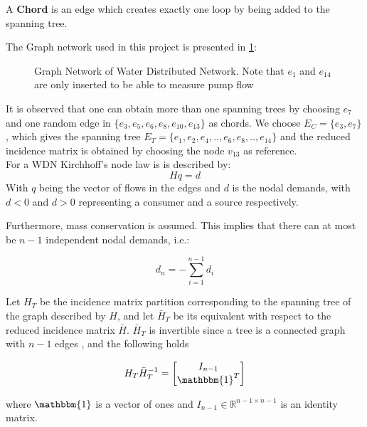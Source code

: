 A \textbf{Chord} is an edge which creates exactly one loop by being added to the spanning tree. 


The Graph network used in this project is presented in \cref{fig:tikzWDNGraph}:

\begin{figure}[h!]
	\centering
		\resizebox{\columnwidth}{!}{
	}
	\caption{Graph Network of Water Distributed Network. Note that $ e_1$ and $e_{14} $ are only inserted to be able to measure pump flow}
	\label{fig:tikzWDNGraph}
\end{figure}
It is observed that one can obtain more than one spanning trees by choosing $ e_7 $ and one random edge in $ \{e_3,e_5,e_6,e_8,e_{10},e_{13}\} $ as chords. We choose 
$ E_C = \{e_3,e_7\} $, which gives the spanning tree 
$ E_T = \{e_1,e_2,e_4,..,e_6,e_8,..,e_{14}\} $ and the reduced incidence matrix is obtained by choosing the node $ v_{13} $ as reference.\\

For a WDN Kirchhoff's node law is \cite{Jensen} is described by:
\begin{equation}\label{eq:KirchNodeLaw}
	Hq = d
\end{equation} 
With $ q $ being the vector of flows in the edges and $ d $ is the nodal demands, with $ d<0 $ and $ d>0 $ representing a consumer and a source respectively.   

Furthermore, mass conservation is assumed. This implies that there can at most be $n-1$ independent nodal demands, i.e.:

\begin{equation}\label{eq:MassConservation}
	d_n = -\sum_{i=1}^{n-1}d_i
\end{equation}

\begin{lemma}\label{lem:TreePartitionLemma}
	Let $H_T$ be the incidence matrix partition corresponding to the spanning tree of the graph described by $H$, and let $\bar{H}_T$ be its equivalent with respect to the reduced incidence matrix $\bar{H}$. $\bar{H}_T$ is invertible since a tree is a connected graph with $n-1$ edges \cite{Deo}, and the following holds
	
	\begin{equation}\label{eq:TreePartitionLemma}
		H_T\bar{H}_T^{-1} = \begin{bmatrix} I_{n-1} \\ \mathbbm{1}^T	\end{bmatrix}
	\end{equation}
	
	where $\mathbbm{1}$ is a vector of ones and $I_{n-1} \in \mathbb{R}^{n-1 \times n-1}$ is an identity matrix.
\end{lemma}


